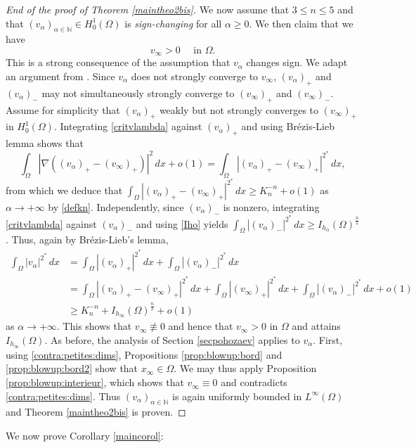 \documentclass[10pt]{amsart}
\numberwithin{equation}{section}
\newcommand{\Om}{\Omega}
\def \va{v_{\alpha}}
\def \vo {v_{\infty}}
\def \nn{\mathbb{N}}
\theoremstyle{plain}
\theoremstyle{remark}
\begin{document}
\begin{proof}[End of the proof of Theorem \ref{maintheo2bis}]
We now assume that $3 \le n \le 5$ and that $(\va)_{\alpha\in\nn}\in H_0^1(\Om)$ is \emph{sign-changing} for all $\alpha \ge 0$. We then claim that we have 
\begin{equation} \label{contra:petites:dims}
 v_\infty >0 \quad \text{ in } \Om. 
 \end{equation}
This is a strong consequence of the assumption that $\va$ changes sign. We adapt an argument from \cite[Lemma 3.1]{CeramiSoliminiStruwe}. Since $\va$ does not strongly converge to $\vo$, $(\va)_+$ and $(\va)_-$ may not simultaneously strongly converge to $(\vo)_+$ and $(\vo)_-$. Assume for simplicity that $(\va)_+$ weakly but not strongly converges to $(\vo)_+$ in $H^1_0(\Om)$. Integrating \eqref{critvlambda} against $(\va)_+$ and using Br\'ezis-Lieb lemma shows that 
$$ \int_\Om |\nabla ( (\va)_+ - (\vo)_+) |^2\, dx + o(1) = \int_{\Om} |(\va)_+ - (\vo)_+|^{2^*} \, dx, $$
from which we deduce that $ \int_{\Om} |(\va)_+ - (\vo)_+|^{2^*} \, dx \ge K_n^{-n} + o(1)$ as $\alpha \to + \infty$ by \eqref{defkn}. Independently, since $(\va)_-$ is nonzero, integrating \eqref{critvlambda} against $(\va)_-$ and using \eqref{Iho} yields $ \int_{\Om} |(\va)_-|^{2^*} \, dx \ge I_{h_\alpha}(\Om)^{\frac{n}{2}}$. 
Thus, again by Br\'ezis-Lieb's lemma,
$$ \begin{aligned} 
\int_\Om |\va|^{2^*} \, dx & = \int_{\Om} |(\va)_+ |^{2^*} \, dx + \int_{\Om} |(\va)_- |^{2^*} \, dx   \\
& =  \int_{\Om} |(\va)_+ - (\vo)_+|^{2^*} \, dx +  \int_{\Om} |(\vo)_+|^{2^*} \, dx +  \int_{\Om} |(\va)_-|^{2^*} \, dx + o(1) \\
& \ge K_n^{- n} + I_{h_\infty}(\Om)^{\frac{n}{2}} + o(1)
\end{aligned} $$ 
as $\alpha \to + \infty$. This shows that $\vo \not \equiv 0$ and hence that $\vo >0$ in $\Om$ and attains $I_{h_\infty}(\Om)$. As before, the analysis of Section \ref{secpohozaev} applies to $\va$. First, using \eqref{contra:petites:dims}, Propositions \ref{prop:blowup:bord} and  \ref{prop:blowup:bord2} show that $x_\infty \in \Om$. We may thus apply Proposition \ref{prop:blowup:interieur}, which shows that $\vo \equiv 0$ and contradicts \eqref{contra:petites:dims}. Thus $(\va)_{\alpha \in \mathbb{N}}$ is again uniformly bounded in $L^\infty(\Om)$ and Theorem \ref{maintheo2bis} is proven. 
 \end{proof}
 
 We now prove Corollary \ref{maincorol}:
 
\end{document}
